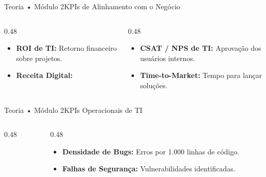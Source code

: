 \begin{senaiframe}{Teoria • Módulo 2}{KPIs de Alinhamento com o Negócio}
  \begin{columns}[t]
    \begin{column}{0.48\textwidth}
      \begin{tcolorbox}[senaibluecard, title={ROI \& Receita}]
        \begin{itemize}
          \item \textbf{ROI de TI:} Retorno financeiro sobre projetos.
          \item \textbf{Receita Digital:} %
        \end{itemize}
      \end{tcolorbox}
    \end{column}
    \begin{column}{0.48\textwidth}
      \begin{tcolorbox}[senaigreencard, title={Satisfação \& Agilidade}]
        \begin{itemize}
          \item \textbf{CSAT / NPS de TI:} Aprovação dos usuários internos.
          \item \textbf{Time-to-Market:} Tempo para lançar soluções.
        \end{itemize}
      \end{tcolorbox}
    \end{column}
  \end{columns}
\end{senaiframe}

\begin{senaiframe}{Teoria • Módulo 2}{KPIs Operacionais de TI}
  \begin{columns}[t]
    \begin{column}{0.48\textwidth}
      \begin{tcolorbox}[senaibluecard, title={Uptime \& SLAs}]
      \end{tcolorbox}
    \end{column}
    \begin{column}{0.48\textwidth}
      \begin{tcolorbox}[senairedcard, title={Qualidade de Código}]
        \begin{itemize}
          \item \textbf{Densidade de Bugs:} Erros por 1.000 linhas de código.
          \item \textbf{Falhas de Segurança:} Vulnerabilidades identificadas.
        \end{itemize}
      \end{tcolorbox}
    \end{column}
  \end{columns}
\end{senaiframe}

